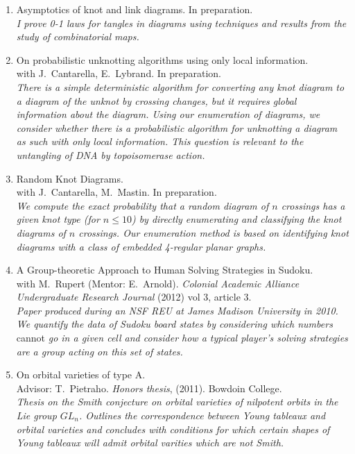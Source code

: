 \documentclass[letterpaper]{article}
\begin{document}
\begin{enumerate}
\item Asymptotics of knot and link diagrams. In preparation.\\
  \textit{I prove 0-1 laws for tangles in diagrams using techniques
    and results from the study of combinatorial maps.}
\item On probabilistic unknotting algorithms using only local information.\\
  with J.\ Cantarella, E.\ Lybrand. In preparation.\\
  \textit{There is a simple deterministic algorithm for converting any
    knot diagram to a diagram of the unknot by crossing changes, but
    it requires global information about the diagram. Using our
    enumeration of diagrams, we consider whether there is a
    probabilistic algorithm for unknotting a diagram as such with only
    local information. This question is relevant to the untangling of
    DNA by topoisomerase action.}
\item Random Knot Diagrams.\\
  with J.\ Cantarella, M.\ Mastin. In preparation.\\
  \textit{We compute the exact probability that a random diagram of
    $n$ crossings has a given knot type (for $n \leq 10$) by directly
    enumerating and classifying the knot diagrams of $n$
    crossings. Our enumeration method is based on identifying knot
    diagrams with a class of embedded 4-regular planar graphs.}
\item A Group-theoretic Approach to Human Solving Strategies in
  Sudoku.\\
  with M.\ Rupert (Mentor: E.\ Arnold). \textit{Colonial Academic
    Alliance
    Undergraduate Research Journal} (2012) vol 3, article 3.\\
  \textit{Paper produced during an NSF REU at James Madison University
    in 2010. We quantify the data of Sudoku board states by
    considering which numbers} cannot \textit{go in a given cell and
    consider how a typical player's solving strategies are a group
    acting on this set of states.}
\item On orbital varieties of type A. \\
  Advisor: T.\ Pietraho. \textit{Honors thesis}, (2011). Bowdoin
  College.\\
  \textit{Thesis on the Smith conjecture on orbital varieties of
    nilpotent orbits in the Lie group $GL_n$.  Outlines the
    correspondence between Young tableaux and orbital varieties and
    concludes with conditions for which certain shapes of Young
    tableaux will admit orbital varities which are not Smith.}
\end{enumerate}
\end{document}
